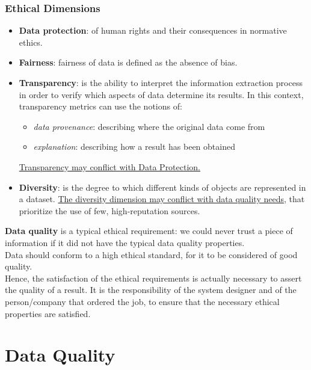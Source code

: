 \documentclass[10pt,a4paper]{article}
\begin{document}
\subsubsection{Ethical Dimensions}
\begin{itemize}
	\item \textbf{Data protection}: of human rights and their consequences in normative ethics.
	\item \textbf{Fairness}: fairness of data is defined as the absence of bias.
	\item \textbf{Transparency}: is the ability to interpret the information extraction process in order to
verify which aspects of data determine its results. In this context, transparency metrics can use the notions of:
\begin{itemize}
	\item \textit{data provenance}: describing where the original data come from
	\item \textit{explanation}: describing how a result has been obtained
\end{itemize}
	\uline{Transparency may conflict with Data Protection.}
	\item \textbf{Diversity}: is the degree to which different kinds of objects are represented in a dataset. \uline{The diversity dimension may conflict with data quality needs}, that prioritize the use of few, high-reputation sources.
\end{itemize}
\textbf{Data quality} is a typical ethical requirement: we could never trust a piece of information if it did not have the typical data quality properties. \\ Data should conform to a high ethical standard, for it to be considered of good quality. \\
Hence, the satisfaction of the ethical requirements is actually necessary to assert the quality of a result. It is the responsibility of the system designer and of the person/company that ordered the job, to ensure that the necessary ethical properties are satisfied.
\pagebreak
\section{Data Quality}
\end{document}
